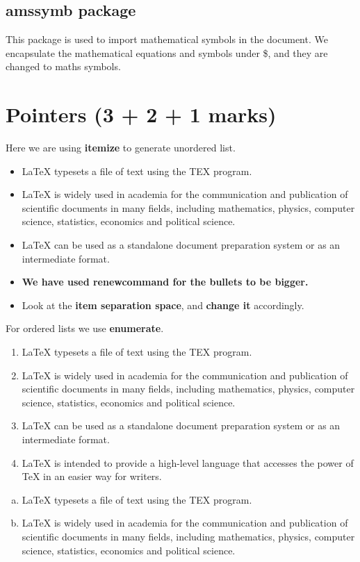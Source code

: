 \documentclass[english,12pt]{article}
\begin{document}
\subsection{amssymb package}
This package is used to import mathematical symbols in the document. We
encapsulate the mathematical equations and symbols under \$, and they are
changed to maths symbols.
\newpage
\section{Pointers (3 + 2 + 1 marks)}
Here we are using \textbf{itemize} to generate unordered list.
\renewcommand\labelitemi{\large$\bullet$}
\begin{itemize}
	\item \LaTeX{ } typesets a file of text using the TEX program.\\
	\item \LaTeX{ } is widely used in academia for the communication and publication
	of scientific documents in many fields, including mathematics, physics,
	computer science, statistics, economics and political science.\\
	\item \LaTeX{ } can be used as a standalone document preparation system or as an
	intermediate format.\\
	\item  \textbf{We have used renewcommand for the bullets to be bigger.}\\
	\item  Look at the \textbf{item separation space}, and \textbf{change it} accordingly.
\end{itemize}
For ordered lists we use \textbf{enumerate}.
\begin{enumerate}[I]
	\item \LaTeX{ } typesets a file of text using the TEX program.
	\item \LaTeX{ } is widely used in academia for the communication and publication
	of scientific documents in many fields, including mathematics, physics,
	computer science, statistics, economics and political science.
	\item \LaTeX{ } can be used as a standalone document preparation system or as an
	intermediate format.
	\item \LaTeX{ } is intended to provide a high-level language that accesses the power
	of TeX in an easier way for writers.
	\end{enumerate}
	\begin{enumerate}[(a)]
	\item \LaTeX{ } typesets a file of text using the TEX program.
	\item \LaTeX{ } is widely used in academia for the communication and publication
	of scientific documents in many fields, including mathematics, physics,
	computer science, statistics, economics and political science.
\end{enumerate}
\end{document}
